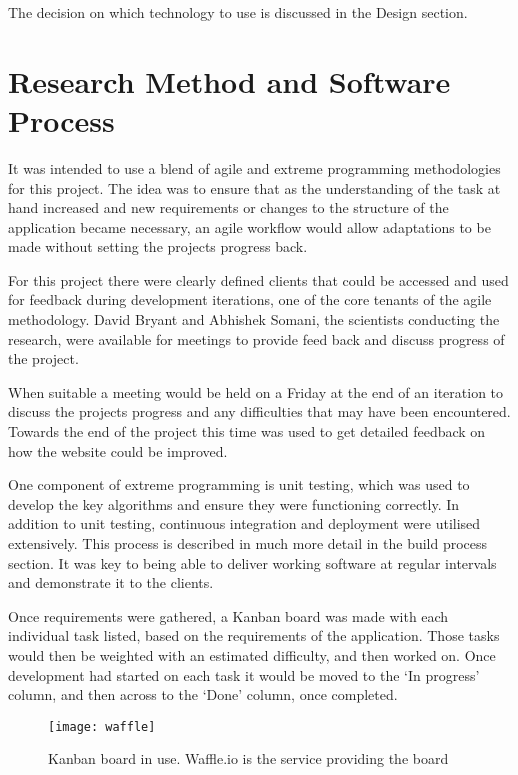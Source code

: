 The decision on which technology to use is discussed in the Design section. 

\section{Research Method and Software Process}
It was intended to use a blend of agile and extreme programming methodologies for this project. The idea was to ensure that as the understanding of the task at hand increased and new requirements or changes to the structure of the application became necessary, an agile workflow would allow adaptations to be made without setting the projects progress back. 

For this project there were clearly defined clients that could be accessed and used for feedback during development iterations, one of the core tenants of the agile methodology. David Bryant and Abhishek Somani, the scientists conducting the research, were available for meetings to provide feed back and discuss progress of the project. 

When suitable a meeting would be held on a Friday at the end of an iteration to discuss the projects progress and any difficulties that may have been encountered. Towards the end of the project this time was used to get detailed feedback on how the website could be improved. 

One component of extreme programming is unit testing, which was used to develop the key algorithms and ensure they were functioning correctly. In addition to unit testing, continuous integration and deployment were utilised extensively. This process is described in much more detail in the build process section. It was key to being able to deliver working software at regular intervals and demonstrate it to the clients. 

Once requirements were gathered, a Kanban\cite{kanban} board was made with each individual task listed, based on the requirements of the application. Those tasks would then be weighted with an estimated difficulty, and then worked on. Once development had started on each task it would be moved to the `In progress' column, and then across to the `Done' column, once completed. 

\begin{figure}[ht!]
\begin{center}
\texttt{[image: waffle]}
\caption{Kanban board in use. Waffle.io is the service providing the board}
\end{center}
\end{figure}

